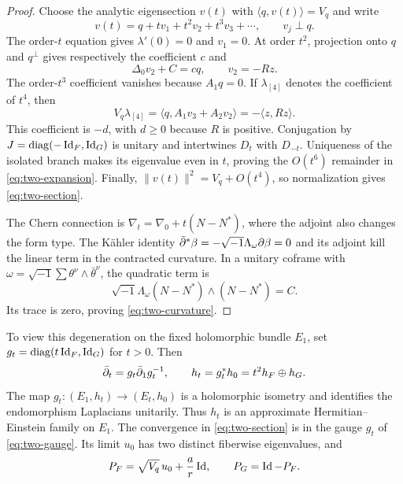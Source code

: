 \begin{proof}
Choose the analytic eigensection $v(t)$ with
$\langle q,v(t)\rangle=V_q$ and write
\[
 v(t)=q+tv_1+t^2v_2+t^3v_3+\cdots,\qquad v_j\perp q.
\]
The order-$t$ equation gives $\lambda'(0)=0$ and $v_1=0$. At order
$t^2$, projection onto $q$ and $q^\perp$ gives respectively the
coefficient $c$ and
\[
 \Delta_0v_2+C=cq,\qquad v_2=-Rz.
\]
The order-$t^3$ coefficient vanishes because $A_1q=0$. If
$\lambda_{[4]}$ denotes the coefficient of $t^4$, then
\[
 V_q\lambda_{[4]}
 =\langle q,A_1v_3+A_2v_2\rangle
 =-\langle z,Rz\rangle.
\]
This coefficient is $-d$, with $d\ge0$ because $R$ is positive.
Conjugation by $J=\operatorname{diag}(-\operatorname{Id}_F,\operatorname{Id}_G)$ is unitary and intertwines
$D_t$ with $D_{-t}$. Uniqueness of the isolated branch makes its
eigenvalue even in $t$, proving the $O(t^6)$ remainder in
\eqref{eq:two-expansion}. Finally,
$\lVert v(t)\rVert^2=V_q+O(t^4)$, so normalization gives
\eqref{eq:two-section}.

The Chern connection is $\nabla_t=\nabla_0+t(N-N^*)$, where the adjoint
also changes the form type. The K\"ahler identity
$\bar\partial^*\beta=-\sqrt{-1}\Lambda_\omega\partial\beta=0$ and its
adjoint kill the linear term in the contracted curvature. In a unitary
coframe with $\omega=\sqrt{-1}\sum\theta^\nu\wedge\bar\theta^\nu$,
the quadratic term is
\[
 \sqrt{-1}\Lambda_\omega(N-N^*)\wedge(N-N^*)=C.
\]
Its trace is zero, proving \eqref{eq:two-curvature}.
\end{proof}

To view this degeneration on the fixed holomorphic bundle $E_1$, set
$g_t=\operatorname{diag}(t\operatorname{Id}_F,\operatorname{Id}_G)$ for $t>0$. Then
\begin{equation}\label{eq:two-gauge}
 \bar\partial_t=g_t\bar\partial_1g_t^{-1},\qquad
 h_t=g_t^*h_0=t^2h_F\oplus h_G.
\end{equation}
The map $g_t:(E_1,h_t)\to(E_t,h_0)$ is a holomorphic isometry and
identifies the endomorphism Laplacians unitarily. Thus $h_t$ is an
approximate Hermitian--Einstein family on $E_1$. The convergence in
\eqref{eq:two-section} is in the gauge $g_t$ of \eqref{eq:two-gauge}. Its limit $u_0$
has two distinct fiberwise eigenvalues, and
\[
 P_F=\sqrt{V_q}\,u_0+\frac ar\operatorname{Id},\qquad P_G=\operatorname{Id}-P_F.
\]

